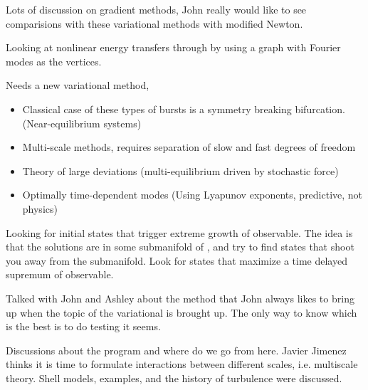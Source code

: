 \begin{description}
{\begin{description}
Lots of discussion on gradient methods, John really would like
to see comparisions with these variational methods with modified
Newton.

Looking at nonlinear energy transfers through by using a graph with Fourier modes
as the vertices.

Needs a new variational method,
\begin{itemize}
\item Classical case of these types of bursts is a symmetry breaking bifurcation. (Near-equilibrium systems)
\item Multi-scale methods, requires separation of slow and fast degrees of freedom
\item Theory of large deviations (multi-equilibrium driven by stochastic force)
\item Optimally time-dependent modes (Using Lyapunov exponents, predictive, not physics)
\end{itemize}

Looking for initial states that trigger extreme growth of observable. The idea
is that the solutions are in some submanifold of {\statesp}, and try to find states
that shoot you away from the submanifold. Look for states that maximize a time
delayed supremum of observable.


\item[Modified Newton's Method]
Talked with John and Ashley about the method that John always likes to bring up when
the topic of the variational {\descent} is brought up. The only way to know
which is the best is to do testing it seems.

\item[Tower room]
Discussions about the program and where do we go from here. Javier Jimenez thinks
it is time to formulate interactions between different scales, i.e. multiscale theory.
Shell models, examples, and the history of turbulence were discussed.
\end{description}
}

\end{description}
\printbibliography[heading=subbibintoc,title={References}]

